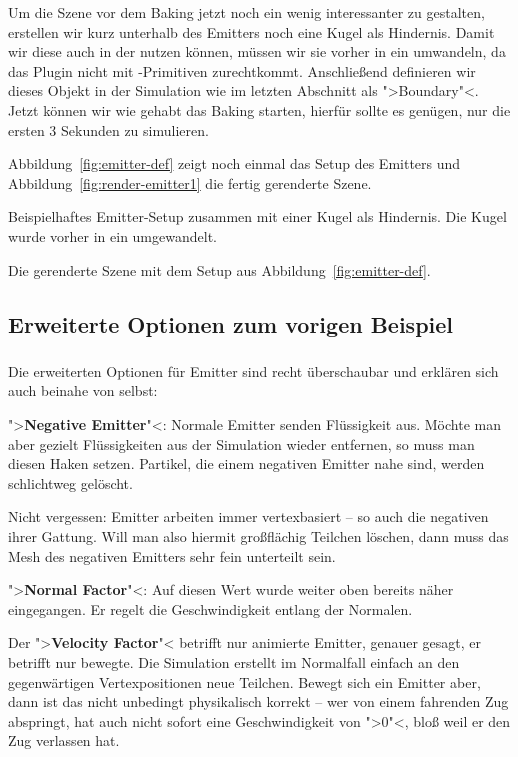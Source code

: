 \documentclass[10pt,DIV=14,a4paper]{scrartcl}
\begin{document}
Um die Szene vor dem Baking jetzt noch ein wenig interessanter zu
gestalten, erstellen wir kurz unterhalb des Emitters noch eine Kugel als
Hindernis. Damit wir diese auch in der \fluidsim nutzen können, müssen
wir sie vorher in ein \TriMesh umwandeln, da das Plugin nicht mit
\aoi-Primitiven zurechtkommt. Anschließend definieren wir dieses Objekt
in der Simulation wie im letzten Abschnitt als ">Boundary"<. Jetzt
können wir wie gehabt das Baking starten, hierfür sollte es genügen, nur
die ersten 3 Sekunden zu simulieren.

Abbildung~\ref{fig:emitter-def} zeigt noch einmal das Setup des Emitters
und Abbildung~\ref{fig:render-emitter1} die fertig gerenderte Szene.

{Beispielhaftes Emitter-Setup zusammen mit einer Kugel als Hindernis.
Die Kugel wurde vorher in ein \TriMesh umgewandelt.}

{Die gerenderte Szene mit dem Setup aus
Abbildung~\ref{fig:emitter-def}.}

\subsection{Erweiterte Optionen zum vorigen Beispiel}
\subsubsection{}
Die erweiterten Optionen für Emitter sind recht überschaubar und
erklären sich auch beinahe von selbst:

\itA
	\item ">\textbf{Negative Emitter}"<: Normale Emitter senden
	Flüssigkeit aus. Möchte man aber gezielt Flüssigkeiten aus der
	Simulation wieder entfernen, so muss man diesen Haken setzen.
	Partikel, die einem negativen Emitter nahe sind, werden schlichtweg
	gelöscht.

	Nicht vergessen: Emitter arbeiten immer vertexbasiert -- so auch
	die negativen ihrer Gattung. Will man also hiermit großflächig
	Teilchen löschen, dann muss das Mesh des negativen Emitters sehr
	fein unterteilt sein.

	\item ">\textbf{Normal Factor}"<: Auf diesen Wert wurde weiter oben
	bereits näher eingegangen. Er regelt die Geschwindigkeit entlang der
	Normalen.

	\item Der ">\textbf{Velocity Factor}"< betrifft nur animierte
	Emitter, genauer gesagt, er betrifft nur bewegte. Die Simulation
	erstellt im Normalfall einfach an den gegenwärtigen Vertexpositionen
	neue Teilchen. Bewegt sich ein Emitter aber, dann ist das nicht
	unbedingt physikalisch korrekt -- wer von einem fahrenden Zug
	abspringt, hat auch nicht sofort eine Geschwindigkeit von ">0"<,
	bloß weil er den Zug verlassen hat.
\end{document}
